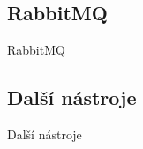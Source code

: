 \documentclass{beamer}
\begin{document}
\subsection{RabbitMQ}
\begin{frame}{RabbitMQ}

\end{frame}

\subsection{Další nástroje}
\begin{frame}{Další nástroje}

\end{frame}
\end{document}
